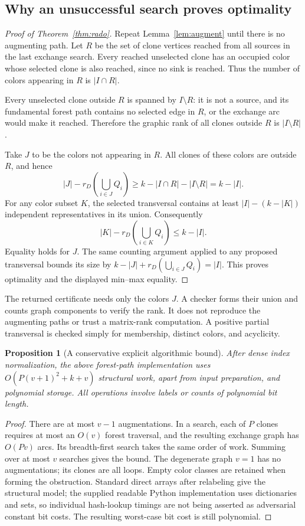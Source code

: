\documentclass[11pt,letterpaper]{article}
\newtheorem{proposition}[theorem]{Proposition}
\theoremstyle{definition}
\theoremstyle{remark}
\begin{document}
\subsection{Why an unsuccessful search proves optimality}
\begin{proof}[Proof of Theorem~\ref{thm:rado}]
Repeat Lemma~\ref{lem:augment} until there is no augmenting path. Let $R$ be the
set of clone vertices reached from all sources in the last exchange search.
Every reached unselected clone has an occupied color whose selected clone is
also reached, since no sink is reached. Thus the number of colors appearing in
$R$ is $|I\cap R|$.

Every unselected clone outside $R$ is spanned by $I\setminus R$: it is not a
source, and its fundamental forest path contains no selected edge in $R$, or the
exchange arc would make it reached. Therefore the graphic rank of all clones
outside $R$ is $|I\setminus R|$.

Take $J$ to be the colors not appearing in $R$. All clones of these colors are
outside $R$, and hence
\[
 |J|-r_D\!\left(\bigcup_{i\in J}Q_i\right)
 \ge k-|I\cap R|-|I\setminus R|=k-|I|.
\]
For any color subset $K$, the selected transversal contains at least
$|I|-(k-|K|)$ independent representatives in its union. Consequently
\[
 |K|-r_D\!\left(\bigcup_{i\in K}Q_i\right)\le k-|I|.
\]
Equality holds for $J$. The same counting argument applied to any proposed
transversal bounds its size by $k-|J|+r_D(\bigcup_{i\in J}Q_i)=|I|$.
This proves optimality and the displayed min--max equality.
\end{proof}

The returned certificate needs only the colors $J$. A checker forms their union
and counts graph components to verify the rank. It does not reproduce the
augmenting paths or trust a matrix-rank computation. A positive partial
transversal is checked simply for membership, distinct colors, and acyclicity.

\begin{proposition}[A conservative explicit algorithmic bound]\label{prop:mi-cost}
After dense index normalization, the above forest-path implementation uses
$O(P(v+1)^2+k+v)$ structural work, apart from input preparation, and polynomial
storage. All operations involve labels or counts of polynomial bit length.
\end{proposition}
\begin{proof}
There are at most $v-1$ augmentations. In a search, each of $P$ clones requires at
most an $O(v)$ forest traversal, and the resulting exchange graph has $O(Pv)$
arcs. Its breadth-first search takes the same order of work. Summing over at most
$v$ searches gives the bound. The degenerate graph $v=1$ has no augmentations;
its clones are all loops. Empty color classes are retained when forming the
obstruction. Standard direct arrays after relabeling give the structural model;
the supplied readable Python implementation uses dictionaries and sets, so
individual hash-lookup timings are not being asserted as adversarial constant
bit costs. The resulting worst-case bit cost is still polynomial.
\end{proof}
\end{document}
